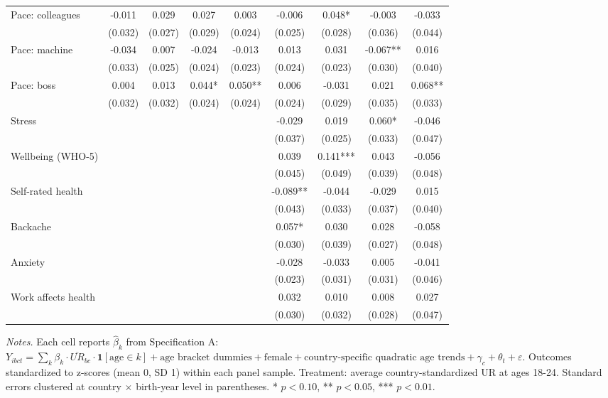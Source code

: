 \begin{table}[htbp]
\begin{threeparttable}
\begin{tabular}{l cccc cccc}
Pace: colleagues & -0.011 & 0.029 & 0.027 & 0.003 & -0.006 & 0.048* & -0.003 & -0.033 \\
 & (0.032) & (0.027) & (0.029) & (0.024) & (0.025) & (0.028) & (0.036) & (0.044) \\[3pt]
Pace: machine & -0.034 & 0.007 & -0.024 & -0.013 & 0.013 & 0.031 & -0.067** & 0.016 \\
 & (0.033) & (0.025) & (0.024) & (0.023) & (0.024) & (0.023) & (0.030) & (0.040) \\[3pt]
Pace: boss & 0.004 & 0.013 & 0.044* & 0.050** & 0.006 & -0.031 & 0.021 & 0.068** \\
 & (0.032) & (0.032) & (0.024) & (0.024) & (0.024) & (0.029) & (0.035) & (0.033) \\[3pt]
Stress &  &  &  &  & -0.029 & 0.019 & 0.060* & -0.046 \\
 &  &  &  &  & (0.037) & (0.025) & (0.033) & (0.047) \\[3pt]
Wellbeing (WHO-5) &  &  &  &  & 0.039 & 0.141*** & 0.043 & -0.056 \\
 &  &  &  &  & (0.045) & (0.049) & (0.039) & (0.048) \\[3pt]
Self-rated health &  &  &  &  & -0.089** & -0.044 & -0.029 & 0.015 \\
 &  &  &  &  & (0.043) & (0.033) & (0.037) & (0.040) \\[3pt]
Backache &  &  &  &  & 0.057* & 0.030 & 0.028 & -0.058 \\
 &  &  &  &  & (0.030) & (0.039) & (0.027) & (0.048) \\[3pt]
Anxiety &  &  &  &  & -0.028 & -0.033 & 0.005 & -0.041 \\
 &  &  &  &  & (0.023) & (0.031) & (0.031) & (0.046) \\[3pt]
Work affects health &  &  &  &  & 0.032 & 0.010 & 0.008 & 0.027 \\
 &  &  &  &  & (0.030) & (0.032) & (0.028) & (0.047) \\[3pt]
\bottomrule
\end{tabular}
\begin{tablenotes}[flushleft]
\footnotesize
\item \textit{Notes.} Each cell reports $\hat{\beta}_k$ from Specification A: $Y_{ibct} = \sum_k \beta_k \cdot \overline{UR}_{bc} \cdot \mathbf{1}[\text{age} \in k] + \text{age bracket dummies} + \text{female} + \text{country-specific quadratic age trends} + \gamma_c + \theta_t + \varepsilon$. Outcomes standardized to z-scores (mean 0, SD 1) within each panel sample. Treatment: average country-standardized UR at ages 18-24. Standard errors clustered at country $\times$ birth-year level in parentheses. * $p<0.10$, ** $p<0.05$, *** $p<0.01$.
\end{tablenotes}
\end{threeparttable}
\end{table}

